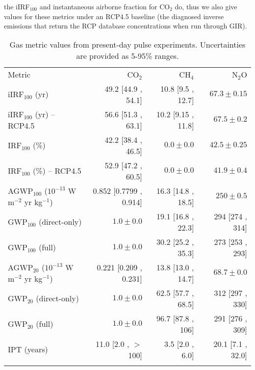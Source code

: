 \documentclass[gmd, manuscript]{copernicus}
\begin{document}
the iIRF$_{100}$ and instantaneous airborne fraction for CO$_2$ do, thus we also give values for these metrics under an RCP4.5 baseline (the diagnosed inverse emissions that return the RCP database concentrations when run through GIR).\\

\begin{table}[t]
    \caption{Gas metric values from present-day pulse experiments. Uncertainties are provided as 5-95\% ranges.} \label{tab:metricresults}
    \begin{tabular}{l r r r}
    \tophline
        Metric & CO$_2$ & CH$_4$ & N$_2$O\\
    \middlehline
        iIRF$_{100}$ (yr) & 49.2 [44.9 , 54.1] & 10.8 [9.5 , 12.7] & $67.3 \pm 0.15$ \\
        iIRF$_{100}$ (yr) -- RCP4.5 & 56.6 [51.3 , 63.1] & 10.2 [9.15 , 11.8] & $67.5 \pm 0.2$ \\
        IRF$_{100}$ (\%) & 42.2 [38.4 , 46.5] & $0.0 \pm 0.0$ & $42.5 \pm 0.25$ \\
        IRF$_{100}$ (\%) -- RCP4.5 & 52.9 [47.2 , 60.5] & $0.0 \pm 0.0$ & $41.9 \pm 0.4$ \\
        AGWP$_{100}$ ($10^{-13}$ W m$^{-2}$ yr kg$^{-1}$) & 0.852 [0.7799 , 0.914] & 16.3 [14.8 , 18.5] & $250 \pm 0.5$ \\ 
        GWP$_{100}$ (direct-only) & $1.0 \pm 0.0$ & 19.1 [16.8 , 22.3] & 294 [274 , 314] \\
        GWP$_{100}$ (full) & $1.0 \pm 0.0$ & 30.2 [25.2 , 35.3] & 273 [253 , 293] \\
        AGWP$_{20}$ ($10^{-13}$ W m$^{-2}$ yr kg$^{-1}$) & 0.221 [0.209 , 0.231] & 13.8 [13.0 , 14.7] & $68.7 \pm 0.0$ \\ 
        GWP$_{20}$ (direct-only) & $1.0 \pm 0.0$ & 62.5 [57.7 , 68.5] & 312 [297 , 330] \\
        GWP$_{20}$ (full) & $1.0 \pm 0.0$ & 96.7 [87.8 , 106] & 291 [276 , 309] \\
        IPT (years) & 11.0 [2.0 , $>$100] & 3.5 [2.0 , 6.0] & 20.1 [7.1 , 32.0] \\
    \bottomhline
    \end{tabular}
    \belowtable{} %
\end{table}
\end{document}
